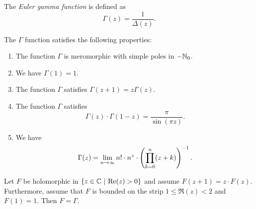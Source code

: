 \begin{definicija}
The \emph{Euler gamma function} is
defined as
\[
\Gamma(z) = \frac{1}{\Delta(z)}.
\]
\end{definicija}

\begin{izrek}
The $\Gamma$ function satisfies the following properties:

\begin{enumerate}
\item The function $\Gamma$ is meromorphic with simple poles in
$-\mathbb{N}_0$.
\item We have $\Gamma(1) = 1$.
\item The function $\Gamma$ satisfies $\Gamma(z+1) = z \Gamma(z)$.
\item The function $\Gamma$ satisfies
\[
\Gamma(z) \cdot \Gamma(1-z) = \frac{\pi}{\sin(\pi z)}.
\]
\item We have
\[
\Gamma(z) =
\lim_{n \to \infty}
n! \cdot n^z \cdot \left(\prod_{k=0}^n (z+k)\right)^{-1}.
\]
\end{enumerate}
\end{izrek}

\obvs

\begin{izrek}
Let $F$ be holomorphic in $\left\{z \in \mathbb{C}~\middle\vert~\operatorname{Re}(z) > 0\right\}$ and assume
$F(z+1) = z \cdot F(z)$. Furthermore, assume that $F$ is bounded
on the strip $1 \leq \Re(z) < 2$ and $F(1) = 1$. Then $F = \Gamma$.
\end{izrek}
